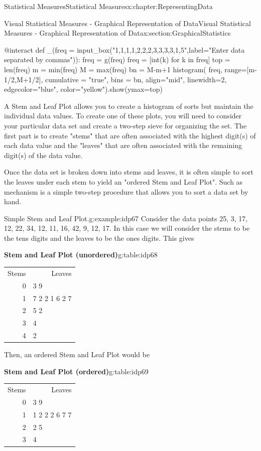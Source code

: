 \documentclass[oneside,10pt,]{book}
\newcommand{\tabularfont}{\relax}
\numberwithin{equation}{section}
\newcommand{\hrulemedium}{\noalign{\hrule height 0.07em}}
\begin{document}
\begin{chapterptx}{Statistical Measures}{}{Statistical Measures}{}{}{x:chapter:RepresentingData}
\begin{sectionptx}{Visual Statistical Measures - Graphical Representation of Data}{}{Visual Statistical Measures - Graphical Representation of Data}{}{}{x:section:GraphicalStatistics}
\begin{sageinput}
@interact
def _(freq = input_box("1,1,1,1,2,2,2,3,3,3,3,1,5",label="Enter data separated by commas")):
    freq = g(freq)
    freq = [int(k) for k in freq]
    top = len(freq)
    m = min(freq)
    M = max(freq)
    bn = M-m+1
    histogram( freq, range=[m-1/2,M+1/2], cumulative = "true", bins = bn, align="mid", linewidth=2, edgecolor="blue", color="yellow").show(ymax=top)
\end{sageinput}
\hypertarget{x:p:GraphicalStatisticsStemAndLeaf}{}%
 A Stem and Leaf Plot allows you to create a histogram of sorts but maintain the individual data values. To create one of these plots, you will need to consider your particular data set and create a two-step sieve for organizing the set.  The first part is to create "stems" that are often associated with the highest digit(s) of each data value and the "leaves" that are often associated with the remaining digit(s) of the data value.%
%
\par
Once the data set is broken down into stems and leaves, it is often simple to sort the leaves under each stem to yield an "ordered Stem and Leaf Plot". Such as mechanism is a simple two-step procedure that allows you to sort a data set by hand.%
\par
\begin{example}{Simple Stem and Leaf Plot.}{g:example:idp67}%
Consider the data points 25, 3, 17, 12, 22, 34, 12, 11, 16, 42, 9, 12, 17. In this case we will consider the stems to be the tens digits and the leaves to be the ones digits. This gives%
\par
\begin{tableptx}{\textbf{Stem and Leaf Plot (unordered)}}{g:table:idp68}{}%
\centering
{\tabularfont%
\begin{tabular}{rr}
Stems&Leaves\tabularnewline\hrulemedium
0&\multicolumn{1}{l}{3 9}\tabularnewline[0pt]
1&\multicolumn{1}{l}{7 2 2 1 6 2 7}\tabularnewline[0pt]
2&\multicolumn{1}{l}{5 2}\tabularnewline[0pt]
3&\multicolumn{1}{l}{4}\tabularnewline[0pt]
4&\multicolumn{1}{l}{2}
\end{tabular}
}%
\end{tableptx}%
 Then, an ordered Stem and Leaf Plot would be \begin{tableptx}{\textbf{Stem and Leaf Plot (ordered)}}{g:table:idp69}{}%
\centering
{\tabularfont%
\begin{tabular}{rr}
Stems&Leaves\tabularnewline\hrulemedium
0&\multicolumn{1}{l}{3 9}\tabularnewline[0pt]
1&\multicolumn{1}{l}{1 2 2 2 6 7 7}\tabularnewline[0pt]
2&\multicolumn{1}{l}{2 5}\tabularnewline[0pt]
3&\multicolumn{1}{l}{4}\tabularnewline[0pt]

\end{tabular}}
\end{tableptx}
\end{example}
\end{sectionptx}
\end{chapterptx}
\end{document}
